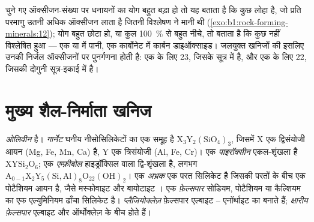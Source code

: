 चुने गए ऑक्सीजन-संख्या पर धनायनों का योग बहुत बड़ा हो तो यह बताता है कि कुछ लोहा  है, जो प्रति परमाणु
उतनी अधिक ऑक्सीजन लाता है जितनी विश्लेषण ने मानी थी (\cref{exo:b1:rock-forming-minerals:12}); योग बहुत छोटा हो, या
कुल \qty{100}{\percent} से बहुत नीचे, तो बताता है कि कुछ नहीं विश्लेषित हुआ --- एक  या  में पानी, एक कार्बोनेट
में कार्बन डाइऑक्साइड। जलयुक्त खनिजों की इसलिए उनकी निर्जल ऑक्सीजनों पर पुनर्गणना होती है: एक  के लिए 23,
जिसके सूत्र में  है, और एक  के लिए 22, जिसकी दोगुनी सूत्र-इकाई में  है।

\section{मुख्य शैल-निर्माता खनिज}

\begin{definition}[मुख्य खनिज समूह]\label{def:b1:rock-forming-minerals:groups}
\emph{ओलिवीन}    है। \emph{गार्नेट} घनीय नीसोसिलिकेटों
का एक समूह है $\mathrm{X_3Y_2(SiO_4)_3}$, जिसमें X एक द्विसंयोजी आयन (Mg, Fe, Mn, Ca) है, Y एक त्रिसंयोजी (Al, Fe, Cr)।
एक \emph{पाइरॉक्सीन} एकल-शृंखला  है $\mathrm{XYSi_2O_6}$; एक
\emph{एम्फ़ीबोल} हाइड्रॉक्सिल वाला द्वि-शृंखला  है, लगभग $\mathrm{A_{0-1}X_2Y_5(Si,Al)_8O_{22}(OH)_2}$। एक
\emph{अभ्रक} एक परत सिलिकेट है जिसकी परतों के बीच एक पोटैशियम आयन है, जैसे मस्कोवाइट 
और बायोटाइट । एक \emph{फ़ेल्सपार} सोडियम, पोटैशियम या कैल्शियम का एक
एल्युमिनियम ढाँचा सिलिकेट है। \emph{प्लैजियोक्लेज़} फ़ेल्सपार एल्बाइट  --
एनॉर्थाइट  का  बनाते हैं; \emph{क्षारीय फ़ेल्सपार} एल्बाइट और
ऑर्थोक्लेज़  के बीच होते हैं।
\end{definition}

